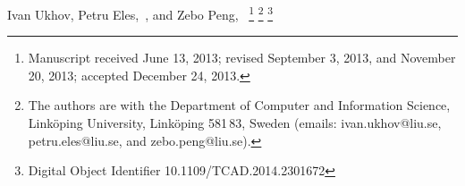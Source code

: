 Ivan Ukhov, Petru Eles,~, and Zebo Peng,~%
\thanks{Manuscript received June 13, 2013; revised September 3, 2013, and November 20, 2013; accepted December 24, 2013.}%
\thanks{The authors are with the Department of Computer and Information Science, Link\"{o}ping University, Link\"{o}ping 581\,83, Sweden (emails: ivan.ukhov@liu.se, petru.eles@liu.se, and zebo.peng@liu.se).}%
\thanks{Digital Object Identifier 10.1109/TCAD.2014.2301672}%
